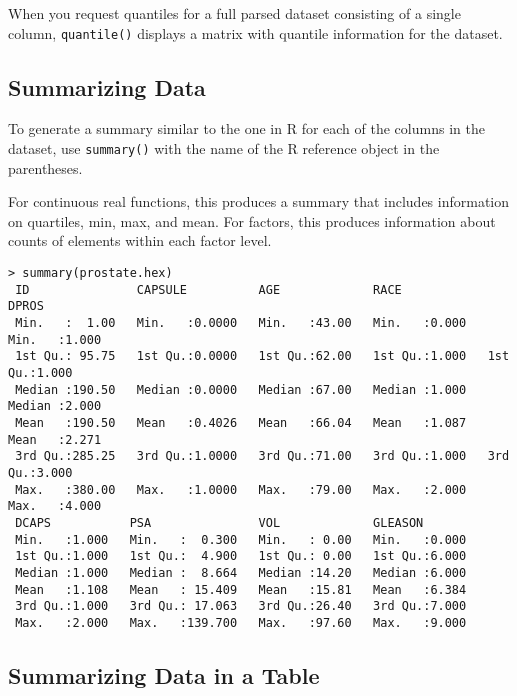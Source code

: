 {{When you request quantiles for a full parsed dataset consisting of a single column, {\texttt{quantile()}} displays a matrix with quantile information for the dataset.

\newpage
\waterExampleInR
\medskip


\subsection{Summarizing Data}

To generate a summary similar to the one in R for each of the columns in the dataset, use {\texttt{summary()}} with the name of the R reference object in the parentheses.

For continuous real functions, this produces a summary that includes information on quartiles, min, max, and mean.
For factors, this produces information about counts of elements within each factor level.

\waterExampleInR
\medskip

\small
\begin{lstlisting}[style=R]
> summary(prostate.hex)
 ID               CAPSULE          AGE             RACE            DPROS
 Min.   :  1.00   Min.   :0.0000   Min.   :43.00   Min.   :0.000   Min.   :1.000
 1st Qu.: 95.75   1st Qu.:0.0000   1st Qu.:62.00   1st Qu.:1.000   1st Qu.:1.000
 Median :190.50   Median :0.0000   Median :67.00   Median :1.000   Median :2.000
 Mean   :190.50   Mean   :0.4026   Mean   :66.04   Mean   :1.087   Mean   :2.271
 3rd Qu.:285.25   3rd Qu.:1.0000   3rd Qu.:71.00   3rd Qu.:1.000   3rd Qu.:3.000
 Max.   :380.00   Max.   :1.0000   Max.   :79.00   Max.   :2.000   Max.   :4.000
 DCAPS           PSA               VOL             GLEASON
 Min.   :1.000   Min.   :  0.300   Min.   : 0.00   Min.   :0.000
 1st Qu.:1.000   1st Qu.:  4.900   1st Qu.: 0.00   1st Qu.:6.000
 Median :1.000   Median :  8.664   Median :14.20   Median :6.000
 Mean   :1.108   Mean   : 15.409   Mean   :15.81   Mean   :6.384
 3rd Qu.:1.000   3rd Qu.: 17.063   3rd Qu.:26.40   3rd Qu.:7.000
 Max.   :2.000   Max.   :139.700   Max.   :97.60   Max.   :9.000
\end{lstlisting}
\normalsize

\subsection{Summarizing Data in a Table}


}}

